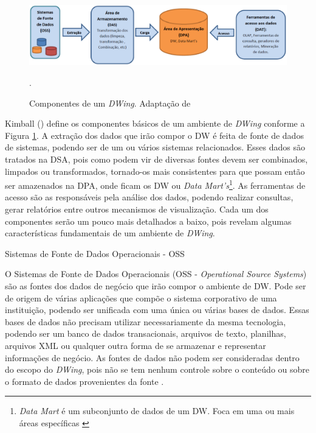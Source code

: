  \begin{figure}[!htb]
 	\centering
 		\includegraphics[scale=0.5]{figuras/componentesDW}
 		\caption{Componentes de um \emph{DWing}. Adaptação de \cite{kimball2002}}.
 		\label{componentesdw}
 \end{figure}


Kimball (\citeyear{kimball2002}) define os componentes básicos de um ambiente de \emph{DWing} conforme a Figura \ref{componentesdw}. A extração dos dados que irão compor o DW é feita de fonte de dados de sistemas, podendo ser de um ou vários sistemas relacionados. Esses dados são tratados na DSA, pois como podem vir de diversas fontes devem ser combinados, limpados ou transformados, tornado-os mais consistentes para que possam então ser amazenados na DPA, onde ficam os DW ou \emph{Data Mart's}\footnote{\emph{Data Mart} é um subconjunto de dados de um DW. Foca em uma ou mais áreas específicas \cite{kimball2002}}. As ferramentas de acesso são as responsáveis pela análise dos dados, podendo realizar consultas, gerar relatórios entre outros mecanismos de visualização. Cada um dos componentes serão um pouco mais detalhados a baixo, pois revelam algumas características fundamentais de um ambiente de \emph{DWing}.

\begin{description}
	\item[Sistemas de Fonte de Dados Operacionais - OSS]
\end{description}
%

O Sistemas de Fonte de Dados Operacionais (OSS - \emph{Operational Source Systems}) são as fontes dos dados de negócio que irão compor o ambiente de DW.
%
Pode ser de origem de várias aplicações que compõe o sistema corporativo de uma instituição, podendo ser unificada com uma única ou várias bases de dados.
%
Essas bases de dados não precisam utilizar necessariamente da mesma tecnologia, podendo ser um banco de dados transacionais, arquivos de texto, planilhas, arquivos XML ou qualquer outra forma de se armazenar e representar informações de negócio.
%
As fontes de dados não podem ser consideradas dentro do escopo do \emph{DWing}, pois  não se tem nenhum controle sobre o conteúdo ou sobre o formato de dados provenientes da fonte \cite{kimball2002}.

